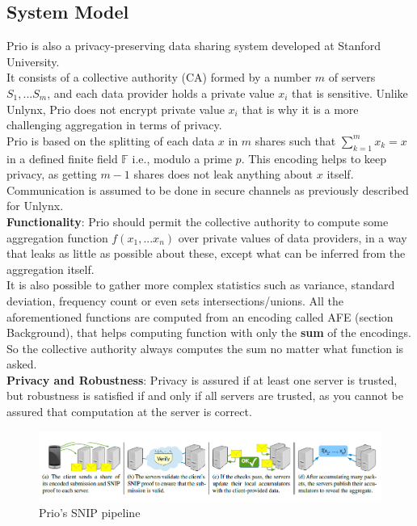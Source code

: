 \documentclass{article}
\begin{document}
\subsection{System Model}
Prio \cite{prio}  is also a privacy-preserving data sharing system developed at Stanford University.\\
It consists of a collective authority (CA) formed by a number $m$ of servers $S_1,...S_m$, and each data provider holds a private value $x_i$ that is sensitive. 
Unlike Unlynx, Prio does not encrypt private value $x_i$ that is why it is a more challenging aggregation in terms of privacy.\\
Prio is based on the splitting of each data $x$ in $m$ shares such that $\sum^m_{k=1}{x_k} = x $ in a defined finite field $\mathbb{F}$ i.e., modulo a prime $p$. This encoding helps to keep privacy, as getting $m-1$ shares does not leak anything about $x$ itself.\\
Communication is assumed to be done in secure channels as previously described for Unlynx.\\
\textbf{Functionality}: Prio should permit the collective authority to compute some aggregation function $f(x_1,...x_n)$ over private values of data providers, in a way that leaks as little as possible about these, except what can be inferred from the aggregation itself.\\
It is also possible to gather more complex statistics such as variance, standard deviation, frequency count or even sets intersections/unions. All the aforementioned functions are computed from an encoding called AFE (section Background), that helps computing function with only the \textbf{sum} of the encodings. So the collective authority always computes the sum no matter what function is asked.\\
\textbf{Privacy and Robustness}: Privacy is assured if at least one server is trusted, but robustness is satisfied if and only if all servers are trusted, as you cannot be assured that computation at the server is correct.
\begin{figure}[H]
\centering
\includegraphics[scale=0.5]{img/prioPip.png}
\caption{Prio's SNIP pipeline}
\end{figure}
\end{document}
